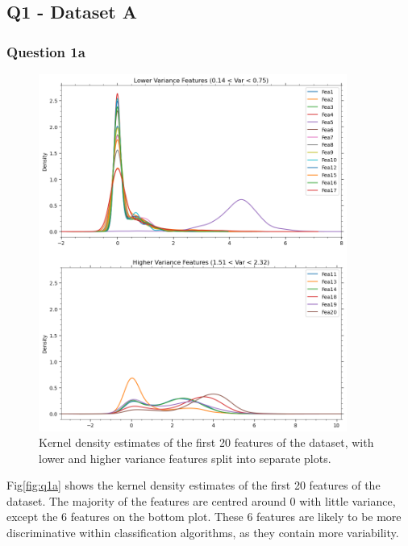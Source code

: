 
\subsection{Q1 - Dataset A}\label{subsec:dataset-a}
\subsubsection{Question 1a}\label{subsubsec:q1a}
    \begin{figure}[htb]
    \centering
    \includegraphics[width=0.9\textwidth]{./figures/q1a}
    \caption{Kernel density estimates of the first 20 features of the  dataset, with lower
        and higher variance features split into separate plots.}
    \label{fig:q1a}
    \end{figure}

    Fig\eqref{fig:q1a} shows the kernel density estimates of the first 20 features of the dataset.
    The majority of the features are centred around 0 with little variance, except the 6 features on the bottom plot.
    These 6 features are likely to be more discriminative within classification algorithms, as they contain more
    variability.

